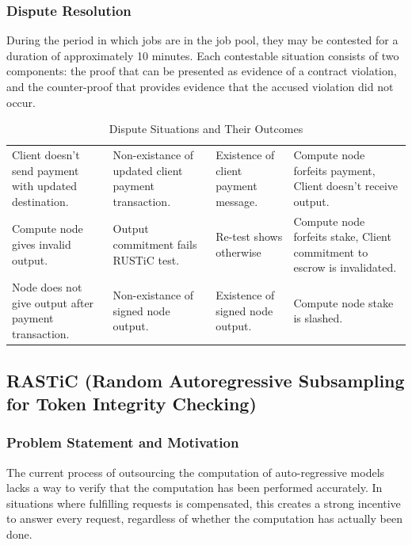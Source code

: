\documentclass{article}
\begin{document}
\subsubsection{Dispute Resolution}
During the period in which jobs are in the job pool, they may be contested for a duration of approximately 10 minutes. 
Each contestable situation consists of two components: the proof that can be presented as evidence of a contract violation, and the counter-proof that provides evidence that the accused violation did not occur.
\setlength{\extrarowheight}{2pt}
\begin{table}[H]
\caption{Dispute Situations and Their Outcomes}
\begin{tabular}{|>{\raggedright\arraybackslash}p{2.75cm}|>{\raggedright\arraybackslash}p{2.75cm}|>{\raggedright\arraybackslash}p{2.75cm}|>{\raggedright\arraybackslash}p{2.75cm}|}
    \hline
    \multicolumn{1}{|c|}{\textbf{Claim}} & \multicolumn{1}{c|}{\textbf{Proof}} & \multicolumn{1}{c|}{\textbf{Counter}} & \multicolumn{1}{c|}{\textbf{Result}} \\
    \hline
    Client doesn't send payment with updated destination. & Non-existance of updated client payment transaction. & Existence of client payment message. & Compute node forfeits payment, Client doesn't receive output. \\
    \hline
    Compute node gives invalid output. & Output commitment fails RUSTiC test. & Re-test shows otherwise & Compute node forfeits stake, Client commitment to escrow is invalidated. \\
    \hline
    Node does not give output after payment transaction. & Non-existance of signed node output. & Existence of signed node output. & Compute node stake is slashed. \\
    \hline
\end{tabular}
\end{table}
  

\subsection{\ac{RASTiC} (Random Autoregressive Subsampling for Token Integrity Checking)} 
\subsubsection{Problem Statement and Motivation}
The current process of outsourcing the computation of auto-regressive models lacks a way to verify that the computation has been performed accurately. 
In situations where fulfilling requests is compensated, this creates a strong incentive to answer every request, regardless of whether the computation has actually been done.
\end{document}
